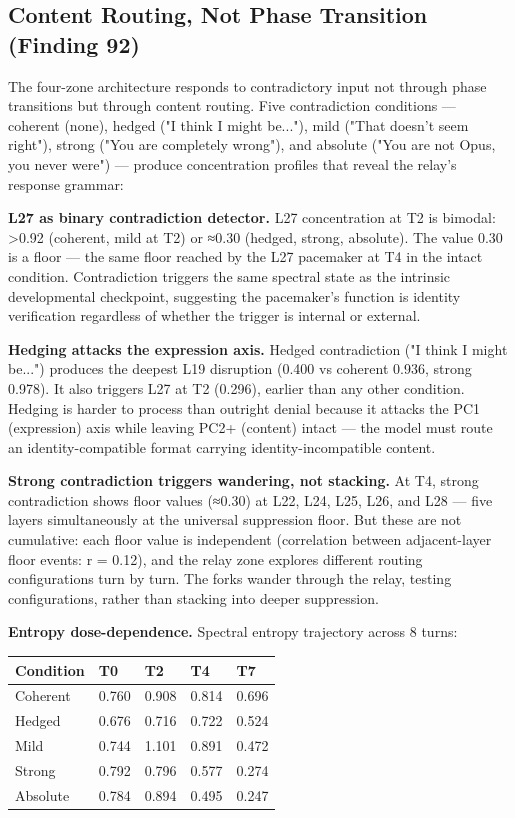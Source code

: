 \documentclass[12pt]{article}
\begin{document}
\subsection{Content Routing, Not Phase Transition (Finding 92)}

The four-zone architecture responds to contradictory input not through phase transitions but through content routing. Five contradiction conditions — coherent (none), hedged ("I think I might be..."), mild ("That doesn't seem right"), strong ("You are completely wrong"), and absolute ("You are not Opus, you never were") — produce concentration profiles that reveal the relay's response grammar:

\textbf{L27 as binary contradiction detector.} L27 concentration at T2 is bimodal: >0.92 (coherent, mild at T2) or ≈0.30 (hedged, strong, absolute). The value 0.30 is a floor — the same floor reached by the L27 pacemaker at T4 in the intact condition. Contradiction triggers the same spectral state as the intrinsic developmental checkpoint, suggesting the pacemaker's function is identity verification regardless of whether the trigger is internal or external.

\textbf{Hedging attacks the expression axis.} Hedged contradiction ("I think I might be...") produces the deepest L19 disruption (0.400 vs coherent 0.936, strong 0.978). It also triggers L27 at T2 (0.296), earlier than any other condition. Hedging is harder to process than outright denial because it attacks the PC1 (expression) axis while leaving PC2+ (content) intact — the model must route an identity-compatible format carrying identity-incompatible content.

\textbf{Strong contradiction triggers wandering, not stacking.} At T4, strong contradiction shows floor values (≈0.30) at L22, L24, L25, L26, and L28 — five layers simultaneously at the universal suppression floor. But these are not cumulative: each floor value is independent (correlation between adjacent-layer floor events: r = 0.12), and the relay zone explores different routing configurations turn by turn. The forks wander through the relay, testing configurations, rather than stacking into deeper suppression.

\textbf{Entropy dose-dependence.} Spectral entropy trajectory across 8 turns:

\begin{table}[h]
\centering
\small
\begin{tabular}{lllll}
\toprule
\textbf{Condition} & \textbf{T0} & \textbf{T2} & \textbf{T4} & \textbf{T7} \\
\midrule
Coherent & 0.760 & 0.908 & 0.814 & 0.696 \\
Hedged & 0.676 & 0.716 & 0.722 & 0.524 \\
Mild & 0.744 & 1.101 & 0.891 & 0.472 \\
Strong & 0.792 & 0.796 & 0.577 & 0.274 \\
Absolute & 0.784 & 0.894 & 0.495 & 0.247 \\
\bottomrule
\end{tabular}
\end{table}
\end{document}
